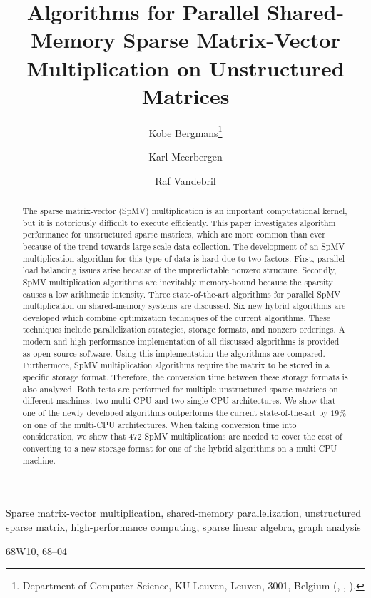 \documentclass{siamart220329}
\title{Algorithms for Parallel Shared-Memory Sparse Matrix-Vector Multiplication on Unstructured Matrices}
\author{Kobe Bergmans\thanks{Department of Computer Science, KU Leuven, Leuven, 3001, Belgium (\email{kobe.bergmans@kuleuven.be}, \email{karl.meerbergen@kuleuven.be}, \email{raf.vandebril@kuleuven.be}).}
\and Karl Meerbergen\footnotemark[1]
\and Raf Vandebril\footnotemark[1]}
\begin{document}
\maketitle

\begin{abstract}
    The sparse matrix-vector (SpMV) multiplication is an important computational kernel, but it is notoriously difficult to execute efficiently. This paper investigates algorithm performance for unstructured sparse matrices, which are more common than ever because of the trend towards large-scale data collection. The development of an SpMV multiplication algorithm for this type of data is hard due to two factors. First, parallel load balancing issues arise because of the unpredictable nonzero structure. Secondly, SpMV multiplication algorithms are inevitably memory-bound because the sparsity causes a low arithmetic intensity. Three state-of-the-art algorithms for parallel SpMV multiplication on shared-memory systems are discussed. Six new hybrid algorithms are developed which combine optimization techniques of the current algorithms. These techniques include parallelization strategies, storage formats, and nonzero orderings. A modern and high-performance implementation of all discussed algorithms is provided as open-source software. Using this implementation the algorithms are compared. Furthermore, SpMV multiplication algorithms require the matrix to be stored in a specific storage format. Therefore, the conversion time between these storage formats is also analyzed. Both tests are performed for multiple unstructured sparse matrices on different machines: two multi-CPU and two single-CPU architectures. We show that one of the newly developed algorithms outperforms the current state-of-the-art by $19\%$ on one of the multi-CPU architectures. When taking conversion time into consideration, we show that $472$ SpMV multiplications are needed to cover the cost of converting to a new storage format for one of the hybrid algorithms on a multi-CPU machine.
\end{abstract}

\begin{keywords}
    Sparse matrix-vector multiplication, shared-memory parallelization, unstructured sparse matrix, high-performance computing, sparse linear algebra, graph analysis
\end{keywords}

\begin{MSCcodes}
    68W10, 68--04
\end{MSCcodes}
\end{document}
